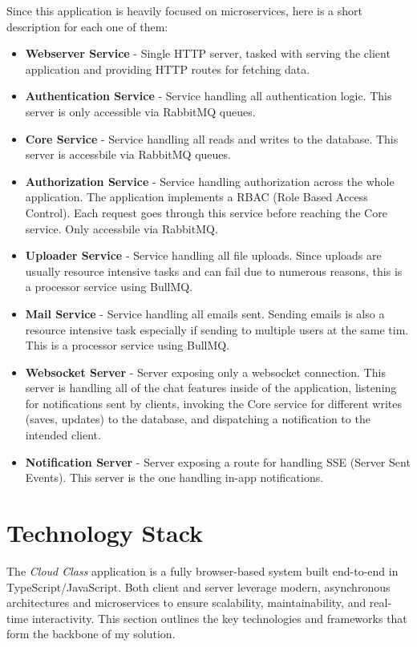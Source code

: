Since this application is heavily focused on microservices, here is a short description for each one of them:
\begin{itemize}
    \item \textbf{Webserver Service} - Single HTTP server, tasked with serving the client application and providing HTTP routes for fetching data.
    \item \textbf{Authentication Service} - Service handling all authentication logic. This server is only accessible via RabbitMQ queues.
    \item \textbf{Core Service} - Service handling all reads and writes to the database. This server is accessbile via RabbitMQ queues.
    \item \textbf{Authorization Service} - Service handling authorization across the whole application. The application implements a RBAC (Role Based Access Control). Each request goes through this service before reaching the Core service. Only accessbile via RabbitMQ.
    \item \textbf{Uploader Service} - Service handling all file uploads. Since uploads are usually resource intensive tasks and can fail due to numerous reasons, this is a processor service using BullMQ.
    \item \textbf{Mail Service} - Service handling all emails sent. Sending emails is also a resource intensive task especially if sending to multiple users at the same tim. This is a processor service using BullMQ.
    \item \textbf{Websocket Server} - Server exposing only a websocket connection. This server is handling all of the chat features inside of the application, listening for notifications sent by clients, invoking the Core service for different writes (saves, updates) to the database, and dispatching a notification to the intended client.
    \item \textbf{Notification Server} - Server exposing a route for handling SSE (Server Sent Events). This server is the one handling in-app notifications. 
\end{itemize}

\section{Technology Stack}

The \emph{Cloud Class} application is a fully browser-based system built end-to-end in TypeScript/JavaScript.  Both client and server leverage modern, asynchronous architectures and microservices to ensure scalability, maintainability, and real-time interactivity.  This section outlines the key technologies and frameworks that form the backbone of my solution.

